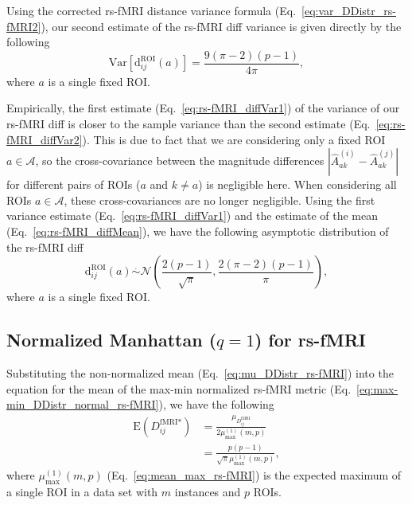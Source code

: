 \documentclass[aos]{imsart}
\begin{document}
Using the corrected rs-fMRI distance variance formula (Eq.~\ref{eq:var_DDistr_rs-fMRI2}), our second estimate of the rs-fMRI diff variance is given directly by the following
%
\begin{equation}\label{eq:rs-fMRI_diffVar2}
\text{Var}\left[\text{d}^\text{ROI}_{ij}(a)\right] = \frac{9(\pi - 2)(p - 1)}{4\pi},
\end{equation}
%
where $a$ is a single fixed ROI.

Empirically, the first estimate (Eq.~\ref{eq:rs-fMRI_diffVar1}) of the variance of our rs-fMRI diff is closer to the sample variance than the second estimate (Eq.~\ref{eq:rs-fMRI_diffVar2}). This is due to fact that we are considering only a fixed ROI $a \in \mathcal{A}$, so the cross-covariance between the magnitude differences $|\hat{A}^{(i)}_{ak} - \hat{A}^{(j)}_{ak}|$ for different pairs of ROIs ($a$ and $k \neq a$) is negligible here. When considering all ROIs $a \in \mathcal{A}$, these cross-covariances are no longer negligible. Using the first variance estimate (Eq.~\ref{eq:rs-fMRI_diffVar1}) and the estimate of the mean (Eq.~\ref{eq:rs-fMRI_diffMean}), we have the following asymptotic distribution of the rs-fMRI diff
%
\begin{equation}
\text{d}^\text{ROI}_{ij}(a) \overset{.}{\sim} \mathcal{N}\left(\frac{2(p-1)}{\sqrt{\pi}},\frac{2(\pi - 2)(p-1)}{\pi}\right),
\end{equation}
%
where $a$ is a single fixed ROI.

\subsection{Normalized Manhattan \texorpdfstring{($q=1$)}{} for rs-fMRI}

Substituting the non-normalized mean (Eq.~\ref{eq:mu_DDistr_rs-fMRI}) into the equation for the mean of the max-min normalized rs-fMRI metric (Eq.~\ref{eq:max-min_DDistr_normal_rs-fMRI}), we have the following
%
\begin{equation}\label{eq:mu_max-min_rs-fMRI}
\begin{aligned}
\text{E}\left(D^\text{fMRI*}_{ij}\right) &= \frac{\mu_{D^\text{fMRI}_{ij}}}{2\mu^{(1)}_\text{max}(m,p)} \\
&= \frac{p(p-1)}{\sqrt{\pi}\mu^{(1)}_\text{max}(m,p)},
\end{aligned}
\end{equation}
%
where $\mu^{(1)}_\text{max}(m,p)$ (Eq.~\ref{eq:mean_max_rs-fMRI}) is the expected maximum of a single ROI in a data set with $m$ instances and $p$ ROIs.
\end{document}
